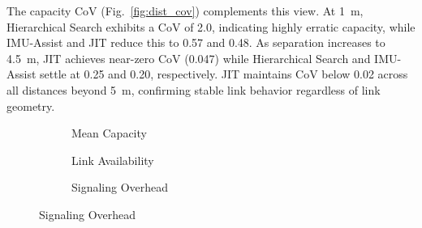 \documentclass[fleqn,10pt]{wlscirep}
\begin{document}
The capacity CoV (Fig.~\ref{fig:dist_cov}) complements this view. At \SI{1}{m}, Hierarchical Search exhibits a CoV of 2.0, indicating highly erratic capacity, while IMU-Assist and JIT reduce this to 0.57 and 0.48. As separation increases to \SI{4.5}{m}, JIT achieves near-zero CoV (0.047) while Hierarchical Search and IMU-Assist settle at 0.25 and 0.20, respectively. JIT maintains CoV below 0.02 across all distances beyond \SI{5}{m}, confirming stable link behavior regardless of link geometry.

\begin{figure}[ht!]
    \centering
    \begin{subfigure}[t]{0.49\textwidth}
        \vspace{0pt}
        \centering
        
        \vspace{-25pt}
        \caption{Mean Capacity}
        \label{fig:angle_rate}
    \end{subfigure}%
    \hfill
    \begin{minipage}[t]{0.49\textwidth}
        \vspace{0pt}
        \centering
        \begin{subfigure}{\linewidth}
            
            \vspace{-25pt}
            \caption{Link Availability}
        \label{fig:angle_avail}
        \end{subfigure}
        \vfill
        \begin{subfigure}{\linewidth}
            
            \vspace{-25pt}
            \caption{Signaling Overhead}
        \label{fig:angle_overhead}
        \end{subfigure}
    \end{minipage}

    \vspace{5 pt}

\end{figure}
\end{document}
